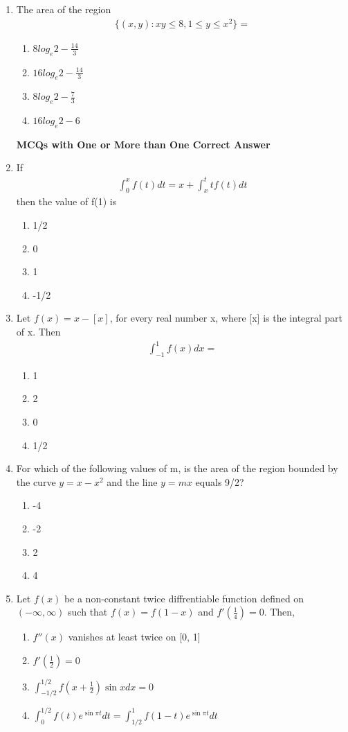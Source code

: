 \begin{enumerate}[label=\arabic*.,ref=\thesubsection.\theenumi]
\item The area of the region
\begin{align*}
\{(x, y): xy \leq 8, 1 \leq y \leq x^2\} = 
\end{align*}
\begin{enumerate}
\item $8log_e2 - \frac{14}{3}$
\item $16log_e2 - \frac{14}{3}$
\item $8log_e2 - \frac{7}{3}$
\item $16log_e2 - 6$
\end{enumerate}

\textbf{MCQs with One or More than One Correct Answer}

\item If 
\begin{align*}
\int_{0}^{x}f(t)dt = x + \int_{x}^{t} tf(t)dt
\end{align*}
then the value of f(1) is
\begin{enumerate}
\item 1/2
\item 0
\item 1
\item -1/2
\end{enumerate}

\item Let $f(x) = x - [x]$, for every real number x, where [x] is the integral part of x. Then 
\begin{align*}
\int_{-1}^{1}f(x)dx = 
\end{align*}
\begin{enumerate}
\item 1
\item 2
\item 0
\item 1/2
\end{enumerate}

\item For which of the following values of m, is the area of the region bounded by the curve $y = x - x^{2}$ and the line 
$y = mx$ equals 9/2?
\begin{enumerate}
\item -4
\item -2
\item  2 
\item  4
\end{enumerate}

\item Let $f(x)$ be a non-constant twice diffrentiable function defined on $(-\infty, \infty)$ such that $f(x) = f(1 - x)$ and $f'(\frac{1}{4}) = 0$. Then,
\begin{enumerate}
\item $f''(x)$ vanishes at least twice on [0, 1]
\item $f'(\frac{1}{2}) = 0$
\item $\int_{-1/2}^{1/2}f(x + \frac{1}{2})\sin x dx = 0$
\item $\int_{0}^{1/2}f(t)e^{\sin \pi t}dt = \int_{1/2}^{1}f(1 - t)e^{\sin \pi t}dt$
\end{enumerate}


\end{enumerate}
